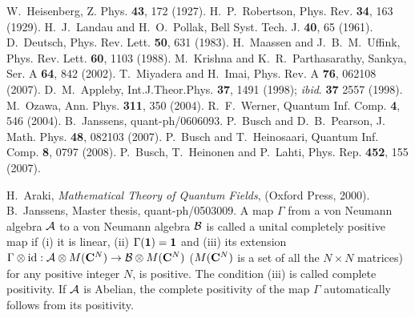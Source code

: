 \documentclass[12pt,showpacs,preprintnumbers,amsmath,amssymb]{revtex4-2}
\begin{document}
\begin{thebibliography}{9}
W.~Heisenberg, Z. Phys. {\bf 43}, 172 (1927).
H.~P.~Robertson, Phys. Rev. {\bf 34}, 163 (1929).
H.~J.~Landau and H.~O.~Pollak, 
Bell Syst. Tech. J. {\bf 40}, 65 (1961).
D.~Deutsch, 
Phys. Rev. Lett. {\bf 50}, 631 (1983).
H.~Maassen and J.~B.~M.~Uffink, 
Phys. Rev. Lett. {\bf 60}, 1103 (1988).
M.~Krishna and K.~R.~Parthasarathy, 
Sankya, Ser. A {\bf 64}, 842 (2002).
T.~Miyadera and H.~Imai, 
Phys. Rev. A {\bf 76}, 062108 (2007).
D.~M.~Appleby,
Int.J.Theor.Phys. {\bf 37}, 1491 (1998); 
{\em ibid}. {\bf 37} 2557 (1998).
M.~Ozawa, 
Ann. Phys. {\bf 311}, 350 (2004). 
R.~F.~Werner, Quantum Inf. Comp. {\bf 4}, 546 (2004).
B.~Janssens, quant-ph/0606093. 
P.~Busch and D.~B.~Pearson, J. Math. Phys. {\bf 48},
082103 (2007).
P.~Busch and T.~Heinosaari, 
Quantum Inf. Comp. {\bf 8}, 0797 (2008).
P.~Busch, T.~Heinonen and P.~Lahti, 
Phys. Rep. {\bf 452}, 155 (2007). 

H.~Araki, {\it Mathematical Theory of Quantum 
Fields}, (Oxford Press, 2000).
B.~Janssens, Master thesis, quant-ph/0503009.
A map $\Gamma$ from a von Neumann algebra 
${\cal A}$ to a von Neumann algebra ${\cal B}$ is called 
a unital completely 
positive map if (i) it is linear, (ii)
$\Gamma({\bf 1})={\bf 1}$ and
(iii) its extension 
$\Gamma \otimes \mbox{id}: 
{\cal A} \otimes M({\bf C}^N) 
\to {\cal B} \otimes M({\bf C}^N)$ 
($M({\bf C}^N)$ is a set of all the $N\times N$ matrices)
for any positive integer $N$, is positive. 
The condition (iii) is called complete positivity. 
If ${\cal A}$ 
is Abelian, the 
complete positivity of the map $\Gamma$ automatically 
follows from its positivity. 
\end{thebibliography}
\end{document}
